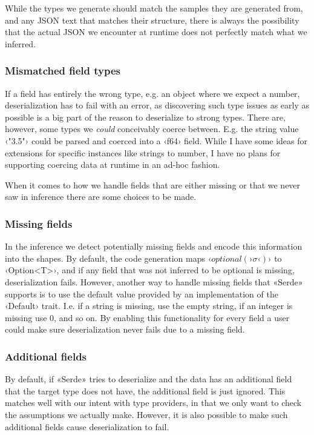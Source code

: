 While the types we generate should match the samples they are generated from, and any JSON text that matches their structure, there is always the possibility that the actual JSON we encounter at runtime does not perfectly match what we inferred.

\subsubsection{Mismatched field types}

If a field has entirely the wrong type, e.g. an object where we expect a number, deserialization has to fail with an error, as discovering such type issues as early as possible is a big part of the reason to deserialize to strong types. There are, however, some types we \emph{could} conceivably coerce between. E.g. the string value ‹"3.5"› could be parsed and coerced into a ‹f64› field. While I have some ideas for extensions for specific instances like strings to number, I have no plans for supporting coercing data at runtime in an ad-hoc fashion.

When it comes to how we handle fields that are either missing or that we never saw in inference there are some choices to be made.

\subsubsection{Missing fields}

In the inference we detect potentially missing fields and encode this information into the shapes. By default, the code generation maps $‹optional(›\sigma‹)›$ to ‹Option<T>›, and if any field that was not inferred to be optional is missing, deserialization fails. However, another way to handle missing fields that «Serde» supports is to use the default value provided by an implementation of the ‹Default› trait. I.e. if a string is missing, use the empty string, if an integer is missing use 0, and so on. By enabling this functionality for every field a user could make sure deserialization never fails due to a missing field.

\subsubsection{Additional fields}

By default, if «Serde» tries to deserialize and the data has an additional field that the target type does not have, the additional field is just ignored. This matches well with our intent with type providers, in that we only want to check the assumptions we actually make. However, it is also possible to make such additional fields cause deserialization to fail.

